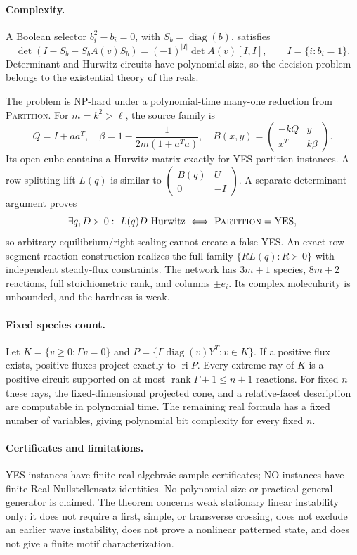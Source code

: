 \documentclass[10pt]{article}
\newcommand{\diag}{\operatorname{diag}}
\begin{document}
\newpage
\paragraph{Complexity.}
A Boolean selector $b_i^2-b_i=0$, with $S_b=\diag(b)$, satisfies
\[
 \det(I-S_b-S_bA(v)S_b)=(-1)^{|I|}\det A(v)[I,I],
 \qquad I=\{i:b_i=1\}.
\]
Determinant and Hurwitz circuits have polynomial size, so the decision problem
belongs to the existential theory of the reals.

The problem is NP-hard under a polynomial-time many-one reduction from
\textsc{Partition}.  For $m=k^2>\ell$, the source family is
\[
 Q=I+aa^T,
 \quad \beta=1-\frac1{2m(1+a^Ta)},
 \quad B(x,y)=\begin{pmatrix}-kQ&y\\x^T&k\beta\end{pmatrix}.
\]
Its open cube contains a Hurwitz matrix exactly for YES partition instances.
A row-splitting lift $L(q)$ is similar to
$\left(\begin{smallmatrix}B(q)&U\\0&-I\end{smallmatrix}\right)$.  A separate
determinant argument proves
\[
 \exists q,D\succ0:\ L(q)D\text{ Hurwitz}
 \iff \textsc{Partition}=\text{YES},
\]
so arbitrary equilibrium/right scaling cannot create a false YES.  An exact
row-segment reaction construction realizes the full family
$\{R L(q):R\succ0\}$ with independent steady-flux constraints.  The network
has $3m+1$ species, $8m+2$ reactions, full stoichiometric rank, and columns
$\pm e_i$.  Its complex molecularity is unbounded, and the hardness is weak.

\paragraph{Fixed species count.}
Let $K=\{v\geq0:\Gamma v=0\}$ and
$P=\{\Gamma\diag(v)Y^T:v\in K\}$.  If a positive flux exists, positive
fluxes project exactly to $\operatorname{ri}P$.  Every extreme ray of $K$ is a
positive circuit supported on at most $\operatorname{rank}\Gamma+1\leq n+1$
reactions.  For fixed $n$ these rays, the fixed-dimensional projected cone,
and a relative-facet description are computable in polynomial time.  The
remaining real formula has a fixed number of variables, giving polynomial bit
complexity for every fixed $n$.

\paragraph{Certificates and limitations.}
YES instances have finite real-algebraic sample certificates; NO instances
have finite Real-Nullstellensatz identities.  No polynomial size or practical
general generator is claimed.  The theorem concerns weak stationary linear
instability only: it does not require a first, simple, or transverse crossing,
does not exclude an earlier wave instability, does not prove a nonlinear
patterned state, and does not give a finite motif characterization.
\end{document}
